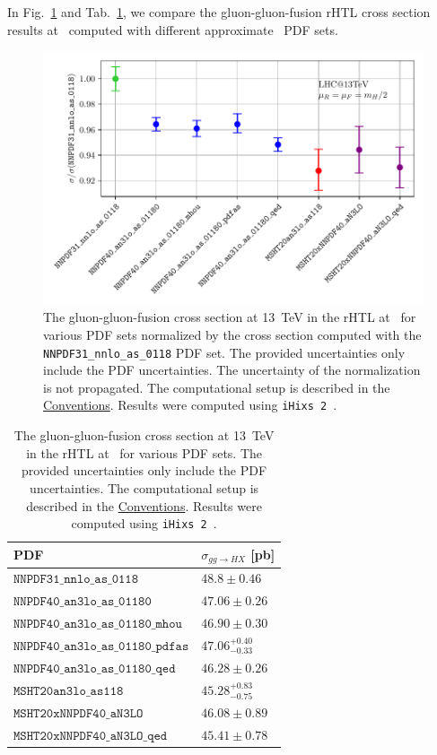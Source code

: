 In Fig.~\ref{fig:4:pdf_benchmark} and Tab.~\ref{tab:4:pdf_benchmark}, we compare the gluon-gluon-fusion \acs{rHTL} cross section results at \NNNLO\ computed with different approximate \NNNLO\ \acs{PDF} sets.
\begin{figure}[ht]
  \centering
  \includegraphics[width=\figurewidth]{Images/pdf_benchmark.pdf}
  \caption{The gluon-gluon-fusion cross section at 13~TeV in the \acs{rHTL} at \NNNLO\ for various \acs{PDF} sets normalized by the cross section computed with the \texttt{NNPDF31\_nnlo\_as\_0118} \acs{PDF} set. The provided uncertainties only include the \acs{PDF} uncertainties. The uncertainty of the normalization is not propagated. The computational setup is described in the \hyperref[chap:notation_and_conventions]{Conventions}. Results were computed using \texttt{iHixs 2}~\cite{Dulat:2018rbf}.}
  \label{fig:4:pdf_benchmark}
\end{figure}
\begin{table}[ht]
  \centering
  \begin{tabular}{l l}
    \hline
    \acs{PDF} & $\sigma_{gg \rightarrow HX}$ [pb] \\
    \hline
    $\mathtt{NNPDF31\_nnlo\_as\_0118}$ & $48.8 \pm 0.46$ \\
    $\mathtt{NNPDF40\_an3lo\_as\_01180}$ & $47.06 \pm 0.26$ \\
    $\mathtt{NNPDF40\_an3lo\_as\_01180\_mhou}$ & $46.90 \pm 0.30$ \\
    $\mathtt{NNPDF40\_an3lo\_as\_01180\_pdfas}$ & $47.06 ^{{+0.40}}_{{-0.33}}$ \\
    $\mathtt{NNPDF40\_an3lo\_as\_01180\_qed}$ & $46.28 \pm 0.26$ \\
    $\mathtt{MSHT20an3lo\_as118}$ & $45.28 ^{{+0.83}}_{{-0.75}}$ \\
    $\mathtt{MSHT20xNNPDF40\_aN3LO}$ & $46.08 \pm 0.89$ \\
    $\mathtt{MSHT20xNNPDF40\_aN3LO\_qed}$ & $45.41 \pm 0.78$ \\
    \hline
  \end{tabular}
  \caption{The gluon-gluon-fusion cross section at 13~TeV in the \acs{rHTL} at \NNNLO\ for various \acs{PDF} sets. The provided uncertainties only include the \acs{PDF} uncertainties. The computational setup is described in the \hyperref[chap:notation_and_conventions]{Conventions}. Results were computed using \texttt{iHixs 2}~\cite{Dulat:2018rbf}.}
  \label{tab:4:pdf_benchmark}
\end{table}

